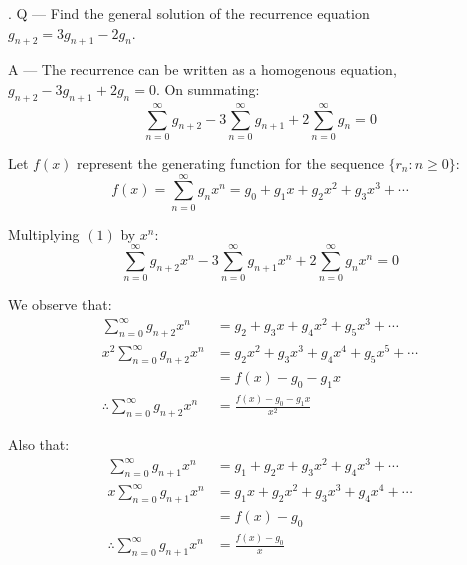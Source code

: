 \documentclass{article}
\newcounter{question}
\begin{document}
\newcommand\Que[1]{%
   \leavevmode\par
   \stepcounter{question}
   \noindent
   \thequestion. Q --- #1\par}

\newcommand\Ans[2][]{%
    \leavevmode\par\noindent
   {\leftskip37pt
    A --- \textbf{#1}#2\par}}

\Que{
    Find the general solution of the recurrence equation\\
    $g_{n+2} = 3g_{n+1}-2g_n$.
}
\Ans{
    The recurrence can be written as a homogenous
    equation, \\
    $g_{n+2} - 3g_{n+1} + 2g_n=0$. On summating:
    \begin{equation}
        \sum_{n=0}^\infty {g_{n+2}} 
        - 3\sum_{n=0}^\infty {g_{n+1}} 
        + 2\sum_{n=0}^\infty {g_n}=0
    \end{equation}

    Let $f(x)$ represent the generating function for the sequence
    $\{r_n\colon n\geq 0\}$:
    \begin{equation*}
        f(x) = \sum_{n=0}^\infty g_n x^n 
        = g_0+g_1x+g_2x^2+g_3x^3+\cdots
    \end{equation*}
    
    Multiplying $(1)$ by $x^n$:
    \begin{equation}
        \sum_{n=0}^\infty {g_{n+2}x^n} 
        - 3\sum_{n=0}^\infty {g_{n+1}x^n} 
        + 2\sum_{n=0}^\infty {g_nx^n} = 0
    \end{equation}
    
    We observe that:
    \begin{align*}
        \sum_{n=0}^\infty {g_{n+2}x^n} & = 
        g_2+g_3x+g_4x^2+g_5x^3+\cdots\\
        x^2\sum_{n=0}^\infty {g_{n+2}x^n} & = 
        g_2x^2+g_3x^3+g_4x^4+g_5x^5+\cdots\\
        & = f(x) - g_0 - g_1x\\
        \therefore
        \sum_{n=0}^\infty {g_{n+2}x^n} & = 
        \frac{f(x) - g_0 - g_1x}{x^2}
    \end{align*}

    Also that:
    \begin{align*}
        \sum_{n=0}^\infty {g_{n+1}x^n} & = 
        g_1+g_2x+g_3x^2+g_4x^3+\cdots\\
        x\sum_{n=0}^\infty {g_{n+1}x^n} & = 
        g_1x+g_2x^2+g_3x^3+g_4x^4+\cdots\\
        & = f(x) - g_0\\
        \therefore
        \sum_{n=0}^\infty {g_{n+1}x^n} & = 
        \frac{f(x) - g_0}{x}
    \end{align*}

}
\end{document}
